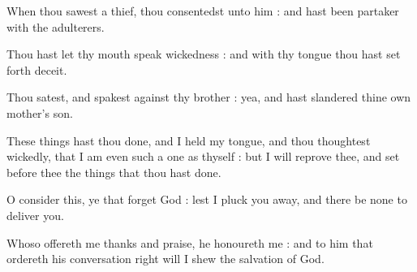 When thou sawest a thief, thou consentedst unto him : and hast been partaker with the adulterers.\par
{}Thou hast let thy mouth speak wickedness : and with thy tongue thou hast set forth deceit.\par
{}Thou satest, and spakest against thy brother : yea, and hast slandered thine own mother's son.\par
{}These things hast thou done, and I held my tongue, and thou thoughtest wickedly, that I am even such a one as thyself : but I will reprove thee, and set before thee the things that thou hast done.\par
{}O consider this, ye that forget God : lest I pluck you away, and there be none to deliver you.\par
{}Whoso offereth me thanks and praise, he honoureth me : and to him that ordereth his conversation right will I shew the salvation of God.\par


